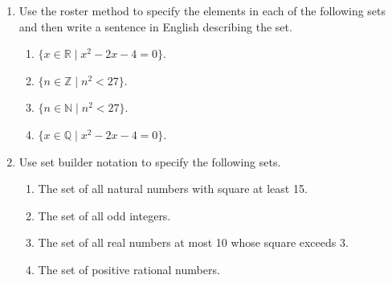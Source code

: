 \documentclass[12pt]{article}
\newcommand{\NN}{{\mathbb N}}
\newcommand{\QQ}{{\mathbb Q}}
\newcommand{\RR}{{\mathbb R}}
\newcommand{\ZZ}{{\mathbb Z}}
\begin{document}
\begin{enumerate}
\item Use the roster method to specify the elements in each of the following sets and then write a sentence in English
  describing the set.
  \begin{enumerate}

   \item $\{ x\in{\RR} \mid x^2-2x-4=0\}$.
   \item $\{n\in \ZZ\mid n^2<27\}$.
   \item $\{n\in \NN\mid n^2<27\}$.
   \item $\{ x\in{\QQ} \mid x^2-2x-4=0\}$.
    
  \end{enumerate}


\item Use set builder notation to specify the following sets.
   \begin{enumerate}

   \item The set of all natural numbers with square at least 15.
   \item The set of all odd integers.
   \item The set of all real numbers at most 10 whose square exceeds $3$.
   \item The set of positive rational numbers.
    
  \end{enumerate}
 
\end{enumerate}
\end{document}
